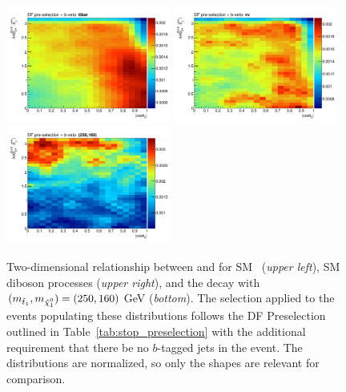 \begin{figure}[!htb]
    \begin{center}
        \includegraphics[width=0.48\textwidth]{figures/search_stop2l/strategy/corr2d/wwbveto_cosThetaB_DPB_vSS_ttbar_2d}
        \includegraphics[width=0.48\textwidth]{figures/search_stop2l/strategy/corr2d/wwbveto_cosThetaB_DPB_vSS_vv_2d}
        \includegraphics[width=0.48\textwidth]{figures/search_stop2l/strategy/corr2d/wwbveto_cosThetaB_DPB_vSS_bwn250_160_2d}
        \caption{
            Two-dimensional relationship between \dpb and \cosb for SM \ttbar~(\textit{upper left}),
            SM diboson processes (\textit{upper right}), and the \bWN decay with $\msn = (250, 160)$\,GeV
            (\textit{bottom}).
            The selection applied to the events populating these distributions follows the DF Preselection outlined in Table~\ref{tab:stop_preselection}
            with the additional requirement that there be no $b$-tagged jets in the event.
            The distributions are normalized, so only the shapes are relevant for comparison.
        }
        \label{fig:stop_corr2d_bveto}
    \end{center}
\end{figure}

